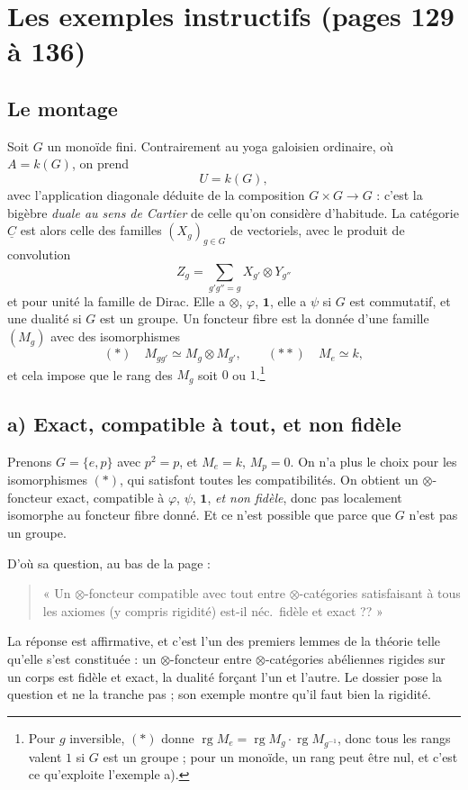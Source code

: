 \documentclass[11pt,a4paper]{article}
\begin{document}
\section*{Les exemples instructifs (pages 129 à 136)}

\subsection*{Le montage}

Soit $G$ un monoïde fini. Contrairement au yoga galoisien ordinaire, où $A = k(G)$, on
prend
\[
U = k(G) ,
\]
avec l'application diagonale déduite de la composition $G \times G \to G$ :
c'est la bigèbre \emph{duale au sens de Cartier} de celle qu'on considère
d'habitude. La catégorie $\underline{C}$ est alors celle des familles
$(X_{g})_{g \in G}$ de vectoriels, avec le produit de convolution
\[
Z_{g} = \sum_{g'g''=g} X_{g'} \otimes Y_{g''}
\]
et pour unité la famille de Dirac. Elle a $\otimes$, $\varphi$, $\mathbf{1}$,
elle a $\psi$ si $G$ est commutatif, et une dualité si $G$ est un groupe. Un
foncteur fibre est la donnée d'une famille $(M_{g})$ avec des isomorphismes
\[
(*)\quad M_{gg'} \simeq M_{g} \otimes M_{g'} ,
\qquad
(**)\quad M_{e} \simeq k ,
\]
et cela impose que le rang des $M_{g}$ soit $0$ ou $1$.\footnote{Pour $g$
inversible, $(*)$ donne $\operatorname{rg}M_{e} = \operatorname{rg}M_{g}
\cdot \operatorname{rg}M_{g^{-1}}$, donc tous les rangs valent $1$ si $G$ est
un groupe ; pour un monoïde, un rang peut être nul, et c'est ce
qu'exploite l'exemple a).}

\subsection*{a) Exact, compatible à tout, et non fidèle}

Prenons $G = \{e, p\}$ avec $p^{2} = p$, et $M_{e} = k$, $M_{p} = 0$. On n'a
plus le choix pour les isomorphismes $(*)$, qui satisfont toutes les
compatibilités. On obtient un $\otimes$-foncteur exact, compatible à $\varphi$,
$\psi$, $\mathbf{1}$, \emph{et non fidèle}, donc pas localement isomorphe au
foncteur fibre donné. Et ce n'est possible que parce que $G$ n'est pas un
groupe.

D'où sa question, au bas de la page :
\begin{quote}
« Un $\otimes$-foncteur compatible avec tout entre $\otimes$-catégories
satisfaisant à tous les axiomes (y compris rigidité) est-il néc.\ fidèle et
exact ?? »
\end{quote}
La réponse est affirmative, et c'est l'un des premiers lemmes de la théorie
telle qu'elle s'est constituée : un $\otimes$-foncteur entre
$\otimes$-catégories abéliennes rigides sur un corps est fidèle et exact, la
dualité forçant l'un et l'autre. Le dossier pose la question et ne la tranche
pas ; son exemple montre qu'il faut bien la rigidité.
\end{document}
